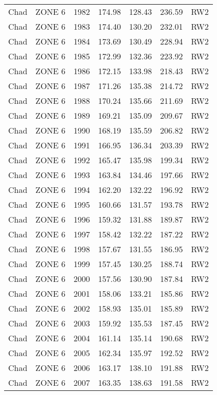 \begin{longtable}{lllrrrl}
  Chad & ZONE 6 & 1982 & 174.98 & 128.43 & 236.59 & RW2 \\ 
  Chad & ZONE 6 & 1983 & 174.40 & 130.20 & 232.01 & RW2 \\ 
  Chad & ZONE 6 & 1984 & 173.69 & 130.49 & 228.94 & RW2 \\ 
  Chad & ZONE 6 & 1985 & 172.99 & 132.36 & 223.92 & RW2 \\ 
  Chad & ZONE 6 & 1986 & 172.15 & 133.98 & 218.43 & RW2 \\ 
  Chad & ZONE 6 & 1987 & 171.26 & 135.38 & 214.72 & RW2 \\ 
  Chad & ZONE 6 & 1988 & 170.24 & 135.66 & 211.69 & RW2 \\ 
  Chad & ZONE 6 & 1989 & 169.21 & 135.09 & 209.67 & RW2 \\ 
  Chad & ZONE 6 & 1990 & 168.19 & 135.59 & 206.82 & RW2 \\ 
  Chad & ZONE 6 & 1991 & 166.95 & 136.34 & 203.39 & RW2 \\ 
  Chad & ZONE 6 & 1992 & 165.47 & 135.98 & 199.34 & RW2 \\ 
  Chad & ZONE 6 & 1993 & 163.84 & 134.46 & 197.66 & RW2 \\ 
  Chad & ZONE 6 & 1994 & 162.20 & 132.22 & 196.92 & RW2 \\ 
  Chad & ZONE 6 & 1995 & 160.66 & 131.57 & 193.78 & RW2 \\ 
  Chad & ZONE 6 & 1996 & 159.32 & 131.88 & 189.87 & RW2 \\ 
  Chad & ZONE 6 & 1997 & 158.42 & 132.22 & 187.22 & RW2 \\ 
  Chad & ZONE 6 & 1998 & 157.67 & 131.55 & 186.95 & RW2 \\ 
  Chad & ZONE 6 & 1999 & 157.45 & 130.25 & 188.74 & RW2 \\ 
  Chad & ZONE 6 & 2000 & 157.56 & 130.90 & 187.84 & RW2 \\ 
  Chad & ZONE 6 & 2001 & 158.06 & 133.21 & 185.86 & RW2 \\ 
  Chad & ZONE 6 & 2002 & 158.93 & 135.01 & 185.89 & RW2 \\ 
  Chad & ZONE 6 & 2003 & 159.92 & 135.53 & 187.45 & RW2 \\ 
  Chad & ZONE 6 & 2004 & 161.14 & 135.14 & 190.68 & RW2 \\ 
  Chad & ZONE 6 & 2005 & 162.34 & 135.97 & 192.52 & RW2 \\ 
  Chad & ZONE 6 & 2006 & 163.17 & 138.10 & 191.88 & RW2 \\ 
  Chad & ZONE 6 & 2007 & 163.35 & 138.63 & 191.58 & RW2 \\ 

\end{longtable}
